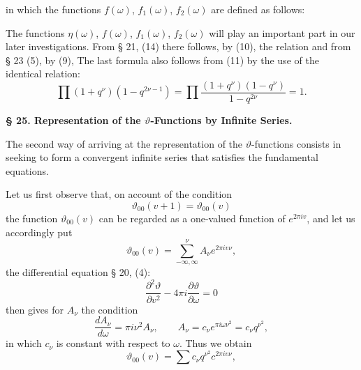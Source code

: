 
in which the functions $f(\omega)$, $f_1(\omega)$, $f_2(\omega)$
are defined as follows:

The functions $\eta(\omega)$, $f(\omega)$, $f_1(\omega)$,
$f_2(\omega)$ will play an important part in our later
investigations. From § 21, (14) there follows, by (10),
the relation
and from § 23 (5), by (9),
The last formula also follows from (11) by the use of the
identical relation:
\[ \prod (1+q^\nu)(1-q^{2\nu-1}) = \prod \frac{(1+q^\nu)(1-q^\nu)}{1-q^{2\nu}} = 1. \]

\begin{center}
\textbf{§ 25. Representation of the $\vartheta$-Functions by
Infinite Series.}
\end{center}

The second way of arriving at the representation of the
$\vartheta$-functions consists in seeking to form a convergent
infinite series that satisfies the fundamental equations.

Let us first observe that, on account of the condition
\[ \vartheta_{00}(v+1) = \vartheta_{00}(v) \]
the function $\vartheta_{00}(v)$ can be regarded as a one-valued
function of $e^{2\pi i v}$, and let us accordingly put
\[ \vartheta_{00}(v) = \sum_{-\infty,\infty}^{\nu} A_\nu e^{2\pi i v \nu}, \]
the differential equation § 20, (4):
\[ \frac{\partial^2 \vartheta}{\partial v^2} - 4\pi i \frac{\partial \vartheta}{\partial \omega} = 0 \]
then gives for $A_\nu$ the condition
\[ \frac{dA_\nu}{d\omega} = \pi i \nu^2 A_\nu, \qquad A_\nu = c_\nu e^{\pi i \omega \nu^2} = c_\nu q^{\nu^2}, \]
in which $c_\nu$ is constant with respect to $\omega$. Thus we obtain
\[ \vartheta_{00}(v) = \sum c_\nu q^{\nu^2} c^{2\pi i v \nu}, \]
